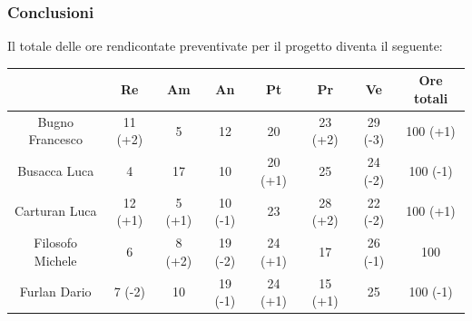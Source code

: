 \subsubsection{Conclusioni} \label{subsubsection:conclusioni}
Il totale delle ore rendicontate preventivate per il progetto diventa il seguente:

\begin{table}[H]
  \centering
  \renewcommand{\arraystretch}{1.8}
  \begin{tabular}{c|c|c|c|c|c|c|c}
    \rowcolor[HTML]{125E28}
    \multicolumn{1}{c}{\color[HTML]{FFFFFF}\textbf{ Nominativo }}
                         & \multicolumn{1}{c}{\color[HTML]{FFFFFF}\textbf{ Re }}
                         & \multicolumn{1}{c}{\color[HTML]{FFFFFF}\textbf{ Am}}
                         & \multicolumn{1}{c}{\color[HTML]{FFFFFF}\textbf{ An }}
                         & \multicolumn{1}{c}{\color[HTML]{FFFFFF}\textbf{ Pt }}
                         & \multicolumn{1}{c}{\color[HTML]{FFFFFF}\textbf{ Pr }}
                         & \multicolumn{1}{c}{\color[HTML]{FFFFFF}\textbf{ Ve }}
                         & \multicolumn{1}{c}{\color[HTML]{FFFFFF}\textbf{ Ore totali }}                                                                                                                         \\
    \hline
    Bugno Francesco      & 11 (+2)                                                       & 5                & 12                & 20                & 23 (+2)           & 29 (-3)            & 100 (+1)          \\
    Busacca Luca         & 4                                                             & 17               & 10                & 20 (+1)           & 25                & 24 (-2)            & 100 (-1)          \\
    Carturan Luca        & 12 (+1)                                                       & 5 (+1)           & 10 (-1)           & 23                & 28 (+2)           & 22 (-2)            & 100 (+1)          \\
    Filosofo Michele     & 6                                                             & 8 (+2)           & 19 (-2)           & 24 (+1)           & 17                & 26 (-1)            & 100               \\
    Furlan Dario         & 7 (-2)                                                        & 10               & 19 (-1)           & 24 (+1)           & 15 (+1)           & 25                 & 100 (-1)          \\

\end{tabular}
\end{table}
